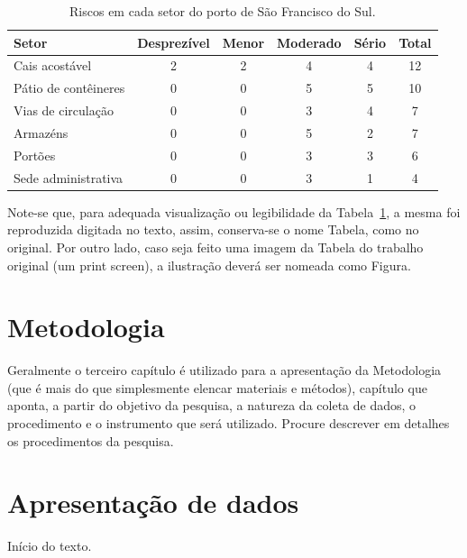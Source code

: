 \documentclass[
	12pt,				%
	oneside,			%
	a4paper,			%
	chapter=TITLE,		%
	section=TITLE,		%
	english,			%
	brazil,				%
	]{abntex2}
\begin{document}
\begin{table}[htb]
    \centering
    \caption{Riscos em cada setor do porto de São Francisco do Sul.}
    \label{Tab:riscos_porto_sfsul}
    \begin{tabular}{lccccc}
        \toprule
        Setor                & Desprezível & Menor & Moderado & Sério & Total \\
        \midrule
        Cais acostável       & 2           & 2     & 4        & 4     & 12    \\
        Pátio de contêineres & 0           & 0     & 5        & 5     & 10    \\
        Vias de circulação   & 0           & 0     & 3        & 4     & 7     \\
        Armazéns             & 0           & 0     & 5        & 2     & 7     \\
        Portões              & 0           & 0     & 3        & 3     & 6     \\
        Sede administrativa  & 0           & 0     & 3        & 1     & 4     \\
        \bottomrule
    \end{tabular}
\end{table}

Note-se que, para adequada visualização ou legibilidade da Tabela~\ref{Tab:riscos_porto_sfsul}, a mesma foi reproduzida digitada no texto, assim, conserva-se o nome Tabela, como no original.
Por outro lado, caso seja feito uma imagem da Tabela do trabalho original (um print screen), a ilustração deverá ser nomeada como Figura.

\chapter{Metodologia} %

Geralmente o terceiro capítulo é utilizado para a apresentação da Metodologia (que é mais do que simplesmente elencar materiais e métodos), capítulo que aponta, a partir do objetivo da pesquisa, a natureza da coleta de dados, o procedimento e o instrumento que será utilizado.
Procure descrever em detalhes os procedimentos da pesquisa.

\chapter{Apresentação de dados}

Início do texto.
\end{document}
